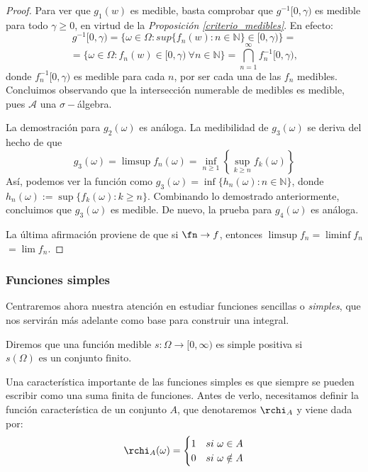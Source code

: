   \begin{proof}
	Para ver que $g_1(w)$ es medible, basta comprobar que $g^{-1}[0,\gamma)$ es medible para todo $\gamma \ge 0$, en virtud de la \textit{Proposición \ref{criterio_medibles}}. En efecto: $$g^{-1}[0,\gamma) = \{\omega \in \Omega : sup\{f_n(w) : n \in \mathbb{N}\} \in [0,\gamma)\} =$$  $$ = \{ \omega \in \Omega : f_n(w) \in [0,\gamma) \ \forall n \in \mathbb{N}\} = \bigcap_{n=1}^{\infty} f_n^{-1}[0,\gamma), $$ donde $f_n^{-1}[0,\gamma)$ es medible para cada $n$, por ser cada una de las $f_n$ medibles. Concluimos observando que la intersección numerable de medibles es medible, pues $\mathscr A$ una $\sigma-$álgebra.

	La demostración para $g_2(\omega)$ es análoga. La medibilidad de $g_3(\omega)$ se deriva del hecho de que $$g_3(\omega) = \limsup f_n(\omega) = \inf_{n \ge 1} \left\{\sup_{k\ge n} f_k(\omega) \right\}$$ Así, podemos ver la función como $g_3(\omega) = \inf \{h_n(\omega) : n \in \mathbb{N}\}$, donde $h_n(\omega) := \sup \{f_k(\omega) : k \ge n\}$. Combinando lo demostrado anteriormente, concluimos que $g_3(\omega)$ es medible. De nuevo, la prueba para $g_4(\omega)$ es análoga.

La última afirmación proviene de que si $\fn \to f$, entonces $\limsup f_n = \liminf f_n$ $=\lim f_n$.
\end{proof}



\subsubsection{Funciones simples}

Centraremos ahora nuestra atención en estudiar funciones sencillas o \textit{simples}, que nos servirán más adelante como base para construir una integral.

\begin{ndef}
  Diremos que una función medible $s: \Omega \to [0,\infty)$ es simple positiva si
  $s(\Omega) \text{ es un conjunto finito}$.
\end{ndef}

Una característica importante de las funciones simples es que siempre se pueden escribir como una suma finita de funciones. Antes de verlo, necesitamos definir la función característica de un conjunto $A$, que denotaremos $\rchi_A$ y viene dada por:
\[
  \rchi_A(\omega)= \begin{cases}
    1 & si \ \omega \in A\\
    0 & si \ \omega \notin A
  \end{cases}
\]

